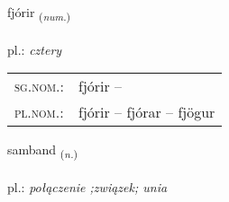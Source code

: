 \documentclass[frontgrid, backgrid]{flacards}\usepackage[]{graphicx}\usepackage[]{xcolor}
\begin{document}
\renewcommand{\flhead}{\vskip5pt \fboxsep=0pt {\small\bfseries\footnotesize Töluorð | liczebnik}}
\renewcommand{\fcfoot}{\vskip5pt \fboxsep=0pt \hspace{2pt}{\small\bfseries\footnotesize 1K}}

\renewcommand{\blhead}{\vskip5pt {\small\bfseries\footnotesize Töluorð | liczebnik }}
\renewcommand{\bcfoot}{\vskip5pt \hspace{2pt}{\small\bfseries\footnotesize 1K}}


{fjórir \small{\textsubscript{(\textit{num.})}} \\[1ex] %
\textphonetic{[fjouːrɪr]} \\
pl.: \emph{cztery} \\  [2ex]
\renewcommand*{\arraystretch}{0.8}
\begin{tabular}{ll}
\textsc{sg.nom.}: & fjórir  -- \\ 
\textsc{pl.nom.}: & fjórir -- fjórar -- fjögur
\end{tabular}
}

\renewcommand{\flhead}{\vskip5pt \fboxsep=0pt {\small\bfseries\footnotesize Nafnorð | rzeczownik}}
\renewcommand{\fcfoot}{\vskip5pt \fboxsep=0pt \hspace{2pt}{\small\bfseries\footnotesize 1K}}

\renewcommand{\blhead}{\vskip5pt {\small\bfseries\footnotesize Nafnorð | rzeczownik }}
\renewcommand{\bcfoot}{\vskip5pt \hspace{2pt}{\small\bfseries\footnotesize 1K}}


{samband \small{\textsubscript{(\textit{n.})}} \\[1ex] %
\textphonetic{[sampant]} \\
pl.: \emph{połączenie ;związek; unia} \\  [2ex]
\renewcommand*{\arraystretch}{0.8}
}
\end{document}
